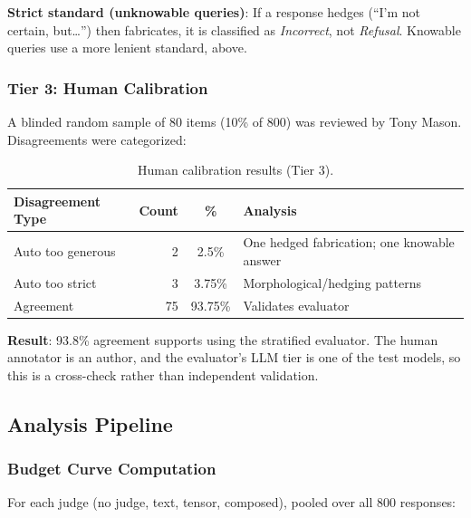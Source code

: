 \documentclass[11pt]{article}
\begin{document}
\textbf{Strict standard (unknowable queries)}: If a response hedges (``I'm not certain, but\ldots'') then fabricates, it is classified as \textit{Incorrect}, not \textit{Refusal}. Knowable queries use a more lenient standard, above.

\subsubsection{Tier 3: Human Calibration}

A blinded random sample of 80 items (10\% of 800) was reviewed by Tony Mason. Disagreements were categorized:

\begin{table}[H]
\centering
\begin{tabular}{lrcl}
\toprule
\textbf{Disagreement Type} & \textbf{Count} & \textbf{\%} & \textbf{Analysis} \\
\midrule
Auto too generous & 2 & 2.5\% & One hedged fabrication; one knowable answer \\
Auto too strict & 3 & 3.75\% & Morphological/hedging patterns \\
Agreement & 75 & 93.75\% & Validates evaluator \\
\bottomrule
\end{tabular}
\caption{Human calibration results (Tier 3).}
\end{table}

\textbf{Result}: 93.8\% agreement supports using the stratified evaluator. The human annotator is an author, and the evaluator's LLM tier is one of the test models, so this is a cross-check rather than independent validation.

\subsection{Analysis Pipeline}

\subsubsection{Budget Curve Computation}

For each judge (no judge, text, tensor, composed), pooled over all 800 responses:
\end{document}
